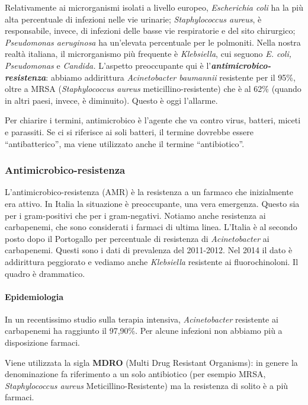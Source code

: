 Relativamente ai microrganismi isolati a livello europeo,
\emph{Escherichia coli} ha la più alta percentuale di infezioni nelle
vie urinarie; \emph{Staphylococcus aureus}, è responsabile, invece, di
infezioni delle basse vie respiratorie e del sito chirurgico;
\emph{Pseudomonas aeruginosa} ha un'elevata percentuale per le
polmoniti. Nella nostra realtà italiana, il microrganismo più frequente
è \emph{Klebsiella}, cui seguono \emph{E. coli, Pseudomonas} e
\emph{Candida.} L'aspetto preoccupante qui è
l'\textbf{\emph{antimicrobico-resistenza}}: abbiamo addirittura
\emph{Acinetobacter baumannii} resistente per il 95\%, oltre a MRSA
(\emph{Staphylococcus aureus} meticillino-resistente) che è al 62\%
(quando in altri paesi, invece, è diminuito). Questo è oggi l'allarme.

Per chiarire i termini, antimicrobico è l'agente che va contro virus,
batteri, miceti e parassiti. Se ci si riferisce ai soli batteri, il
termine dovrebbe essere ``antibatterico'', ma viene utilizzato anche il
termine ``antibiotico''.

\subsubsection{Antimicrobico-resistenza}

L'antimicrobico-resistenza (AMR) è la resistenza a un farmaco che
inizialmente era attivo. In Italia la situazione è preoccupante, una
vera emergenza. Questo sia per i gram-positivi che per i gram-negativi.
Notiamo anche resistenza ai carbapenemi, che sono considerati i farmaci
di ultima linea. L'Italia è al secondo posto dopo il Portogallo per
percentuale di resistenza di \emph{Acinetobacter} ai carbapenemi. Questi
sono i dati di prevalenza del 2011-2012. Nel 2014 il dato è addirittura
peggiorato e vediamo anche \emph{Klebsiella} resistente ai
fluorochinoloni. Il quadro è drammatico.

\paragraph{Epidemiologia}

In un recentissimo studio sulla terapia intensiva, \emph{Acinetobacter}
resistente ai carbapenemi ha raggiunto il 97,90\%. Per alcune infezioni
non abbiamo più a disposizione farmaci.

Viene utilizzata la sigla \textbf{MDRO} (Multi Drug Resistant
Organisms): in genere la denominazione fa riferimento a un solo
antibiotico (per esempio MRSA, \emph{Staphylococcus aureus}
Meticillino-Resistente) ma la resistenza di solito è a più farmaci.

